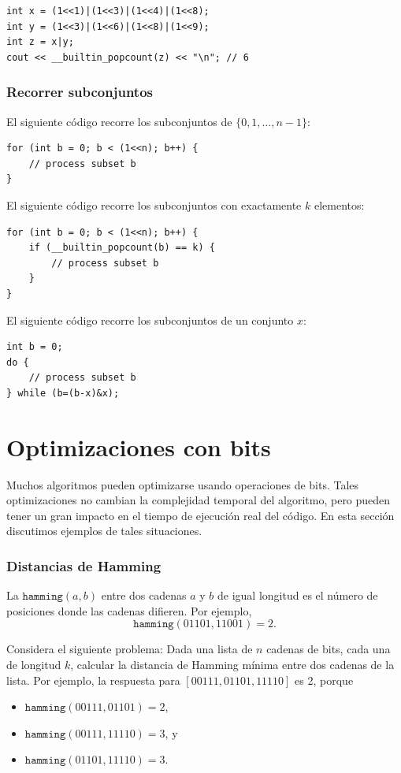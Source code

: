 \begin{lstlisting}
int x = (1<<1)|(1<<3)|(1<<4)|(1<<8);
int y = (1<<3)|(1<<6)|(1<<8)|(1<<9);
int z = x|y;
cout << __builtin_popcount(z) << "\n"; // 6
\end{lstlisting}

\subsubsection{Recorrer subconjuntos}

El siguiente código recorre
los subconjuntos de $\{0,1,\ldots,n-1\}$:

\begin{lstlisting}
for (int b = 0; b < (1<<n); b++) {
    // process subset b
}
\end{lstlisting}
El siguiente código recorre
los subconjuntos con exactamente $k$ elementos:
\begin{lstlisting}
for (int b = 0; b < (1<<n); b++) {
    if (__builtin_popcount(b) == k) {
        // process subset b
    }
}
\end{lstlisting}
El siguiente código recorre los subconjuntos
de un conjunto $x$:
\begin{lstlisting}
int b = 0;
do {
    // process subset b
} while (b=(b-x)&x);
\end{lstlisting}

\section{Optimizaciones con bits}

Muchos algoritmos pueden optimizarse usando
operaciones de bits.
Tales optimizaciones no cambian la
complejidad temporal del algoritmo,
pero pueden tener un gran impacto
en el tiempo de ejecución real del código.
En esta sección discutimos ejemplos
de tales situaciones.

\subsubsection{Distancias de Hamming}

La 
$\texttt{hamming}(a,b)$ entre dos
cadenas $a$ y $b$ de igual longitud es
el número de posiciones donde las cadenas difieren.
Por ejemplo,
\[\texttt{hamming}(01101,11001)=2.\]

Considera el siguiente problema: Dada
una lista de $n$ cadenas de bits, cada una de longitud $k$,
calcular la distancia de Hamming mínima
entre dos cadenas de la lista.
Por ejemplo, la respuesta para $[00111,01101,11110]$
es 2, porque
\begin{itemize}[noitemsep]
\item $\texttt{hamming}(00111,01101)=2$,
\item $\texttt{hamming}(00111,11110)=3$, y
\item $\texttt{hamming}(01101,11110)=3$.
\end{itemize}

